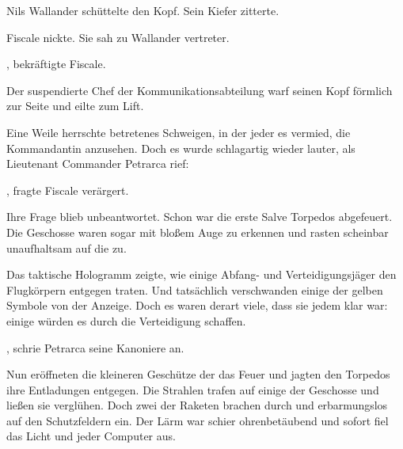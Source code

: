 \par

Nils Wallander schüttelte den Kopf. Sein Kiefer zitterte. 

\par

Fiscale nickte.  Sie sah zu Wallander vertreter. 

\par


\par

, bekräftigte Fiscale. 

\par

Der suspendierte Chef der Kommunikationsabteilung warf seinen Kopf förmlich zur Seite und eilte zum Lift.

\par

Eine Weile herrschte betretenes Schweigen, in der jeder es vermied, die Kommandantin anzusehen. Doch es wurde schlagartig wieder lauter, als Lieutenant Commander Petrarca rief: 

\par

, fragte Fiscale verärgert. 

\par

Ihre Frage blieb unbeantwortet. Schon war die erste Salve Torpedos abgefeuert. Die Geschosse waren sogar mit bloßem Auge zu erkennen und rasten scheinbar unaufhaltsam auf die  zu.

\par

Das taktische Hologramm zeigte, wie einige Abfang- und Verteidigungsjäger den Flugkörpern entgegen traten. Und tatsächlich verschwanden einige der gelben Symbole von der Anzeige. Doch es waren derart viele, dass sie jedem klar war: einige würden es durch die Verteidigung schaffen.

\par

, schrie Petrarca seine Kanoniere an. 

\par

Nun eröffneten die kleineren Geschütze der  das Feuer und jagten den Torpedos ihre Entladungen entgegen. Die Strahlen trafen auf einige der Geschosse und ließen sie verglühen. Doch zwei der Raketen brachen durch und erbarmungslos auf den Schutzfeldern ein. Der Lärm war schier ohrenbetäubend und sofort fiel das Licht und jeder Computer aus.